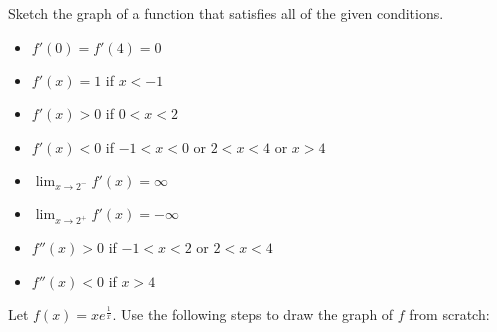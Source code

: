 \documentclass[12pt, addpoints]{exam/exam}
\newcommand{\1}{^{-1}}
\theoremstyle{plain}
\begin{document}
\begin{questions}
\thispagestyle{headandfoot}

\question[] %
Sketch the graph of a function that satisfies all of the given conditions.
	\begin{itemize}
	\item $f'(0)=f'(4)=0$
	\item $f'(x)=1$ if $x<-1$
	\item $f'(x)>0$ if $0<x<2$
	\item $f'(x)<0$ if $-1<x<0$ or $2<x<4$ or $x>4$
	\item $\lim_{x\to 2^-}f'(x)=\infty$
	\item $\lim_{x\to 2^+}f'(x)=-\infty$
	\item $f''(x)>0$ if $-1<x<2$ or $2<x<4$
	\item $f''(x)<0$ if $x>4$
	\end{itemize}
	
\question %
Let $f(x)=xe^{\frac{1}{x}}$.  Use the following steps to draw the graph of $f$ from scratch:
\vspace{0.5pc}
\end{questions}
\end{document}
